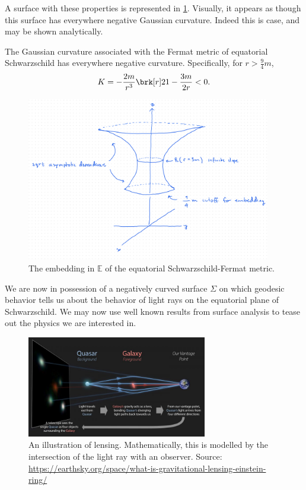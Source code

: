 %
A surface with these properties is represented in \cref{fig:embedding}.
Visually, it appears as though this surface has everywhere negative Gaussian curvature. Indeed this is case, and may be shown analytically.
\begin{proposition}[]\label{prop:neg-gauss-curve}
The Gaussian curvature associated with the Fermat metric of equatorial Schwarzschild has everywhere negative curvature. Specifically, for $r > \frac{9}{4}m$,
\begin{equation}\label{}
K = - \frac{2m}{r^3}\brk[r]2{1 - \frac{3m}{2r}} < 0.
\end{equation}
\end{proposition}
%
\begin{figure}[!htb]
	\centering
	\includegraphics[width=0.95\textwidth]{img/embedding.png}
	\caption{The embedding in $\mathbb{E}$ of the equatorial Schwarzschild-Fermat metric.}
	\label{fig:embedding}
\end{figure}

We are now in possession of a negatively curved surface $\Sigma$ on which geodesic behavior tells us about the behavior of light rays on the equatorial plane of Schwarzschild. We may now use well known results from surface analysis to tease out the physics we are interested in.

\begin{figure}[!htb]
	\centering
	\includegraphics[width=0.7\textwidth]{img/lensing.png}
	\caption{An illustration of lensing. Mathematically, this is modelled by the intersection of the light ray with an observer. Source: \url{https://earthsky.org/space/what-is-gravitational-lensing-einstein-ring/}}
	\label{fig:lensing}
\end{figure}

